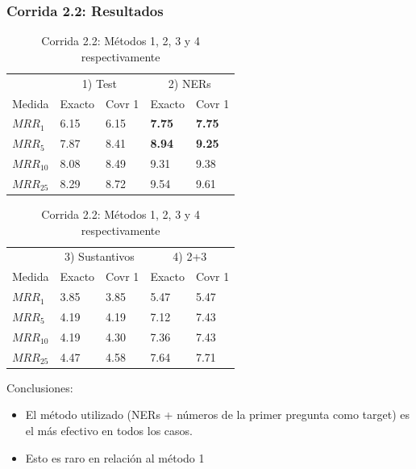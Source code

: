 \begin{frame}
\frametitle{Corrida 2.2: Resultados}

\begin{table}
\centering
\begin{center}
\begin{tabular}{|l | l | l | l | l |}

& \multicolumn{2}{|c|}{1) Test} & \multicolumn{2}{|c|}{2) NERs}  \\ 
Medida & Exacto & Covr 1 & Exacto & Covr 1 \\ 
$MRR_{1}$ & 6.15 & 6.15 & \textbf{{\color{green}7.75}} & \textbf{{\color{green}7.75}} \\ 
$MRR_{5}$ & 7.87 & 8.41 & \textbf{{\color{green}8.94}} & \textbf{{\color{green}9.25}}  \\ 
$MRR_{10}$ & 8.08 & 8.49 & 9.31 & 9.38  \\ 
$MRR_{25}$ & 8.29 & 8.72 & 9.54 & 9.61  \\ 
\end{tabular}

\medskip

\begin{tabular}{|l | l | l | l | l |}

& \multicolumn{2}{|c|}{3) Sustantivos} & \multicolumn{2}{|c|}{4) 2+3} \\ 
Medida & Exacto & Covr 1 & Exacto & Covr 1 \\ 
$MRR_{1}$ & 3.85 & 3.85 & 5.47 & 5.47 \\ 
$MRR_{5}$ & 4.19 & 4.19 & 7.12 & 7.43 \\ 
$MRR_{10}$ & 4.19 & 4.30 & 7.36 & 7.43 \\ 
$MRR_{25}$ & 4.47 & 4.58 & 7.64 & 7.71 \\ 
\end{tabular}
\caption{Corrida 2.2: Métodos 1, 2, 3 y 4 respectivamente}
\end{center}
\end{table}

Conclusiones:
\begin{itemize}
 \item El método utilizado (NERs + números de la primer pregunta como target) es el más efectivo en todos los casos.
 \item {\color{red}Esto es raro en relación al método 1}
\end{itemize}


\end{frame}


